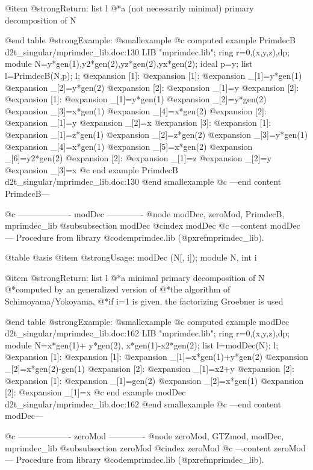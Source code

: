 @item @strong{Return:}
list l
@*a (not necessarily minimal) primary decomposition of N

@end table
@strong{Example:}
@smallexample
@c computed example PrimdecB d2t_singular/mprimdec_lib.doc:130 
LIB "mprimdec.lib";
ring r=0,(x,y,z),dp;
module N=y*gen(1),y2*gen(2),yz*gen(2),yx*gen(2);
ideal p=y;
list l=PrimdecB(N,p);
l;
@expansion{} [1]:
@expansion{}    [1]:
@expansion{}       _[1]=y*gen(1)
@expansion{}       _[2]=y*gen(2)
@expansion{}    [2]:
@expansion{}       _[1]=y
@expansion{} [2]:
@expansion{}    [1]:
@expansion{}       _[1]=y*gen(1)
@expansion{}       _[2]=y*gen(2)
@expansion{}       _[3]=x*gen(1)
@expansion{}       _[4]=x*gen(2)
@expansion{}    [2]:
@expansion{}       _[1]=y
@expansion{}       _[2]=x
@expansion{} [3]:
@expansion{}    [1]:
@expansion{}       _[1]=z*gen(1)
@expansion{}       _[2]=z*gen(2)
@expansion{}       _[3]=y*gen(1)
@expansion{}       _[4]=x*gen(1)
@expansion{}       _[5]=x*gen(2)
@expansion{}       _[6]=y2*gen(2)
@expansion{}    [2]:
@expansion{}       _[1]=z
@expansion{}       _[2]=y
@expansion{}       _[3]=x
@c end example PrimdecB d2t_singular/mprimdec_lib.doc:130
@end smallexample
@c ---end content PrimdecB---

@c ------------------- modDec -------------
@node modDec, zeroMod, PrimdecB, mprimdec_lib
@subsubsection modDec
@cindex modDec
@c ---content modDec---
Procedure from library @code{mprimdec.lib} (@pxref{mprimdec_lib}).

@table @asis
@item @strong{Usage:}
modDec (N[, i]); module N, int i

@item @strong{Return:}
list l
@*a minimal primary decomposition of N
@*computed by an generalized version of
@*the algorithm of Schimoyama/Yokoyama,
@*if i=1 is given, the factorizing Groebner is used

@end table
@strong{Example:}
@smallexample
@c computed example modDec d2t_singular/mprimdec_lib.doc:162 
LIB "mprimdec.lib";
ring r=0,(x,y,z),dp;
module N=x*gen(1)+ y*gen(2),
x*gen(1)-x2*gen(2);
list l=modDec(N);
l;
@expansion{} [1]:
@expansion{}    [1]:
@expansion{}       _[1]=x*gen(1)+y*gen(2)
@expansion{}       _[2]=x*gen(2)-gen(1)
@expansion{}    [2]:
@expansion{}       _[1]=x2+y
@expansion{} [2]:
@expansion{}    [1]:
@expansion{}       _[1]=gen(2)
@expansion{}       _[2]=x*gen(1)
@expansion{}    [2]:
@expansion{}       _[1]=x
@c end example modDec d2t_singular/mprimdec_lib.doc:162
@end smallexample
@c ---end content modDec---

@c ------------------- zeroMod -------------
@node zeroMod, GTZmod, modDec, mprimdec_lib
@subsubsection zeroMod
@cindex zeroMod
@c ---content zeroMod---
Procedure from library @code{mprimdec.lib} (@pxref{mprimdec_lib}).

